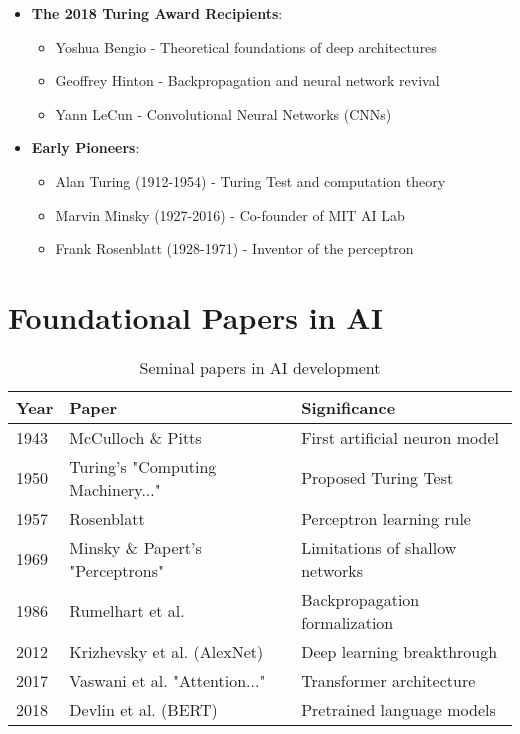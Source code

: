 \documentclass[openany]{book}
\begin{document}
\begin{itemize}
    \item \textbf{The 2018 Turing Award Recipients}:
    \begin{itemize}
        \item Yoshua Bengio - Theoretical foundations of deep architectures
        \item Geoffrey Hinton - Backpropagation and neural network revival
        \item Yann LeCun - Convolutional Neural Networks (CNNs)
    \end{itemize}
    
    \item \textbf{Early Pioneers}:
    \begin{itemize}
        \item Alan Turing (1912-1954) - Turing Test and computation theory
        \item Marvin Minsky (1927-2016) - Co-founder of MIT AI Lab
        \item Frank Rosenblatt (1928-1971) - Inventor of the perceptron
    \end{itemize}
\end{itemize}

\section{Foundational Papers in AI}

\begin{table}[h]
\centering
\begin{tabular}{|l|l|l|}
\hline
\textbf{Year} & \textbf{Paper} & \textbf{Significance} \\ \hline
1943 & McCulloch \& Pitts & First artificial neuron model \\ \hline
1950 & Turing's "Computing Machinery..." & Proposed Turing Test \\ \hline
1957 & Rosenblatt & Perceptron learning rule \\ \hline
1969 & Minsky \& Papert's "Perceptrons" & Limitations of shallow 
networks \\ \hline
1986 & Rumelhart et al. & Backpropagation formalization \\ \hline
2012 & Krizhevsky et al. (AlexNet) & Deep learning breakthrough \\ \hline
2017 & Vaswani et al. "Attention..." & Transformer architecture \\ \hline
2018 & Devlin et al. (BERT) & Pretrained language models \\ \hline
\end{tabular}
\caption{Seminal papers in AI development}
\end{table}
\end{document}
